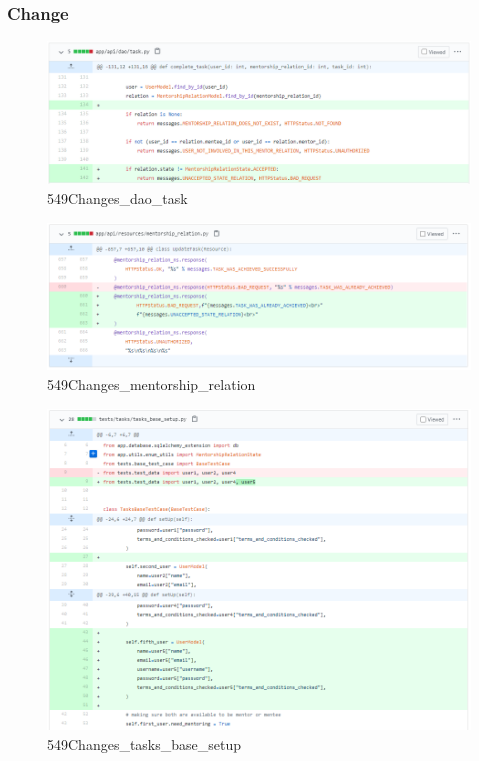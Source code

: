 \documentclass{article}
\begin{document}
\subsubsection{Change}
\begin{figure}[tph!]
\centerline{\includegraphics[totalheight=15cm, width=16cm]{549Changes_dao_task.png}}
    \caption{549Changes\_dao\_task}
    \label{fig:verticalcell}
\end{figure}
\begin{figure}[tph!]
\centerline{\includegraphics[totalheight=15cm, width=16cm]{549Changes_mentorship_relation.png}}
    \caption{549Changes\_mentorship\_relation}
    \label{fig:verticalcell}
\end{figure}
\begin{figure}[tph!]
\centerline{\includegraphics[totalheight=15cm, width=16cm]{549Changes_tasks_base_setup.png}}
    \caption{549Changes\_tasks\_base\_setup}
    \label{fig:verticalcell}
\end{figure}
\end{document}
